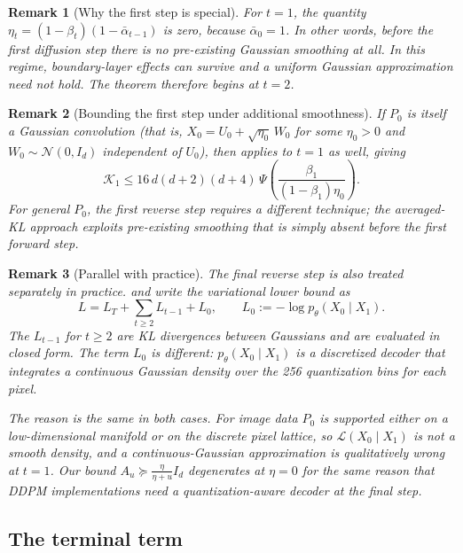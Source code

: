 \documentclass[11pt]{article}
\newcommand{\PsiFn}{\Psi}
\newtheorem{remark}{Remark}
\begin{document}
\begin{remark}[Why the first step is special]
\label{rem:first_step_special}
For \(t=1\), the quantity \(\eta_t=(1-\beta_t)(1-\bar\alpha_{t-1})\) is zero, because \(\bar\alpha_0=1\). In other words, before the first diffusion step there is no pre-existing Gaussian smoothing at all. In this regime, boundary-layer effects can survive and a uniform Gaussian approximation need not hold. The theorem therefore begins at \(t=2\).
\end{remark}

\begin{remark}[Bounding the first step under additional smoothness]
\label{rem:first_step_smoothness}
If \(P_0\) is itself a Gaussian convolution (that is, \(X_0 = U_0 + \sqrt{\eta_0}\,W_0\) for some \(\eta_0>0\) and \(W_0\sim\mathcal N(0,I_d)\) independent of \(U_0\)), then  applies to \(t=1\) as well, giving
\[
\mathcal K_1
\le
16\,d(d+2)(d+4)\,\PsiFn\!\left(\frac{\beta_1}{(1-\beta_1)\eta_0}\right).
\]
For general \(P_0\), the first reverse step requires a different technique; the averaged-KL approach exploits pre-existing smoothing that is simply absent before the first forward step.
\end{remark}

\begin{remark}[Parallel with practice] 
\label{rem:first_step_practice}
The final reverse step is also treated separately in practice. \cite{ho2020denoising} and \cite{nichol2021improved} write the variational lower bound as
\[
L = L_T + \sum_{t\ge 2} L_{t-1} + L_0,
\qquad L_0 := -\log p_\theta(X_0\mid X_1).
\]
The \(L_{t-1}\) for \(t\ge 2\) are KL divergences between Gaussians and are evaluated in closed form. The term \(L_0\) is different: \(p_\theta(X_0\mid X_1)\) is a discretized decoder that integrates a continuous Gaussian density over the 256 quantization bins for each pixel.

The reason is the same in both cases. For image data \(P_0\) is supported either on a low-dimensional manifold or on the discrete pixel lattice, so \(\mathcal L(X_0\mid X_1)\) is not a smooth density, and a continuous-Gaussian approximation is qualitatively wrong at \(t=1\). Our bound \(A_u\succeq\frac{\eta}{\eta+u}I_d\) degenerates at \(\eta=0\) for the same reason that DDPM implementations need a quantization-aware decoder at the final step.
\end{remark}

\subsection{The terminal term}
\end{document}
